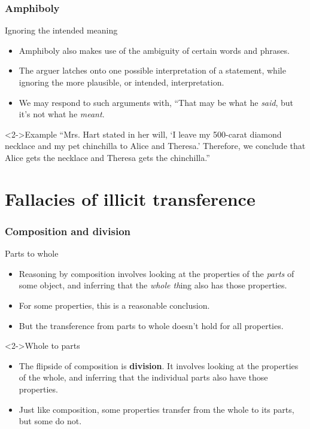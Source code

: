 \documentclass[10pt,letterpaper,xcolor=dvipsnames,handout]{beamer}
\begin{document}
\begin{frame}
  \frametitle{Amphiboly}
  
  \begin{block}{Ignoring the intended meaning}
    \begin{itemize}
      \item Amphiboly also makes use of the ambiguity of certain words and phrases.
      \item The arguer latches onto one possible interpretation of a statement, while ignoring the more plausible, or intended, interpretation.
      \item We may respond to such arguments with, ``That may be what he \textit{said}, but it's not what he \textit{meant}.
    \end{itemize}
  \end{block}
  
  \begin{block}<2->{Example}
    ``Mrs. Hart stated in her will, `I leave my 500-carat diamond necklace and my pet chinchilla to Alice and Theresa.' Therefore, we conclude that Alice gets the necklace and Theresa gets the chinchilla.''
  \end{block}

  
\end{frame}


\section{Fallacies of illicit transference}

\begin{frame}
  \frametitle{Composition and division}
  
  \begin{block}{Parts to whole}
    \begin{itemize}
      \item Reasoning by composition involves looking at the properties of the \textit{parts} of some object, and inferring that the \textit{whole th}ing also has those properties.
      \item For some properties, this is a reasonable conclusion.
      \item But the transference from parts to whole doesn't hold for all properties.
    \end{itemize}
  \end{block}
  
  \begin{block}<2->{Whole to parts}
    \begin{itemize}
      \item The flipside of composition is \textbf{division}.  It involves looking at the properties of the whole, and inferring that the individual parts also have those properties.
      \item Just like composition, some properties transfer from the whole to its parts, but some do not.
    \end{itemize}
  \end{block}
  
\end{frame}
\end{document}
